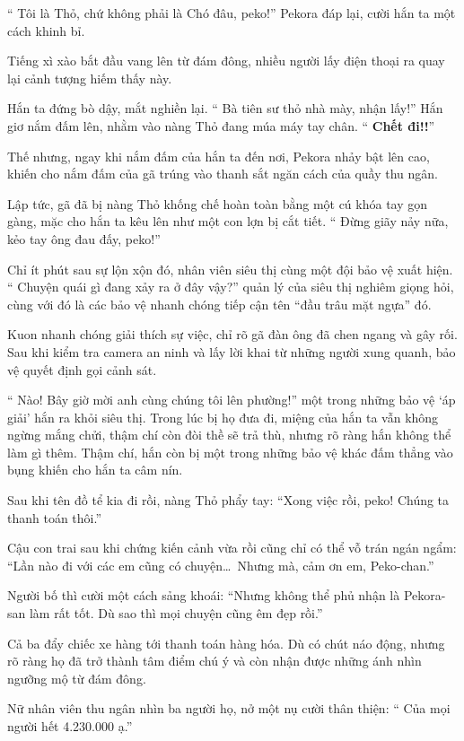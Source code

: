 \documentclass[../main.tex]{subfiles}
\begin{document}
``{\color{red} Tôi là Thỏ, chứ không phải là Chó đâu, peko!}'' Pekora đáp lại, cười hắn ta một cách khinh bỉ.

Tiếng xì xào bắt đầu vang lên từ đám đông, nhiều người lấy điện thoại ra quay lại cảnh tượng hiếm thấy này.

Hắn ta đứng bò dậy, mắt nghiền lại. ``{\color{red} Bà tiên sư thỏ nhà mày, nhận lấy!}'' Hắn giơ nắm đấm lên, nhằm vào nàng Thỏ đang múa máy tay chân. ``{\color{red} \textbf{Chết đi!!}}''

Thế nhưng, ngay khi nắm đấm của hắn ta đến nơi, Pekora nhảy bật lên cao, khiến cho nắm đấm của gã trúng vào thanh sắt ngăn cách của quầy thu ngân.

Lập tức, gã đã bị nàng Thỏ khống chế hoàn toàn bằng một cú khóa tay gọn gàng, mặc cho hắn ta kêu lên như một con lợn bị cắt tiết. ``{\color{red} Đừng giãy nảy nữa, kẻo tay ông đau đấy, peko!}''

Chỉ ít phút sau sự lộn xộn đó, nhân viên siêu thị cùng một đội bảo vệ xuất hiện. ``{\color{red} Chuyện quái gì đang xảy ra ở đây vậy?}'' quản lý của siêu thị nghiêm giọng hỏi, cùng với đó là các bảo vệ nhanh chóng tiếp cận tên ``đầu trâu mặt ngựa'' đó.

Kuon nhanh chóng giải thích sự việc, chỉ rõ gã đàn ông đã chen ngang và gây rối. Sau khi kiểm tra camera an ninh và lấy lời khai từ những người xung quanh, bảo vệ quyết định gọi cảnh sát.

``{\color{red} Nào! Bây giờ mời anh cùng chúng tôi lên phường!}'' một trong những bảo vệ `áp giải' hắn ra khỏi siêu thị. Trong lúc bị họ đưa đi, miệng của hắn ta vẫn không ngừng mắng chửi, thậm chí còn đòi thề sẽ trả thù, nhưng rõ ràng hắn không thể làm gì thêm. Thậm chí, hắn còn bị một trong những bảo vệ khác đấm thẳng vào bụng khiến cho hắn ta câm nín.

Sau khi tên đồ tể kia đi rồi, nàng Thỏ phẩy tay: ``Xong việc rồi, peko! Chúng ta thanh toán thôi.''

Cậu con trai sau khi chứng kiến cảnh vừa rồi cũng chỉ có thể vỗ trán ngán ngẩm: ``Lần nào đi với các em cũng có chuyện\dots\ Nhưng mà, cảm ơn em, Peko-chan.''

Người bố thì cười một cách sảng khoái: ``Nhưng không thể phủ nhận là Pekora-san làm rất tốt. Dù sao thì mọi chuyện cũng êm đẹp rồi.''

Cả ba đẩy chiếc xe hàng tới thanh toán hàng hóa. Dù có chút náo động, nhưng rõ ràng họ đã trở thành tâm điểm chú ý và còn nhận được những ánh nhìn ngưỡng mộ từ đám đông.

Nữ nhân viên thu ngân nhìn ba người họ, nở một nụ cười thân thiện: ``{\color{red} Của mọi người hết 4.230.000 ạ.}''
\end{document}
